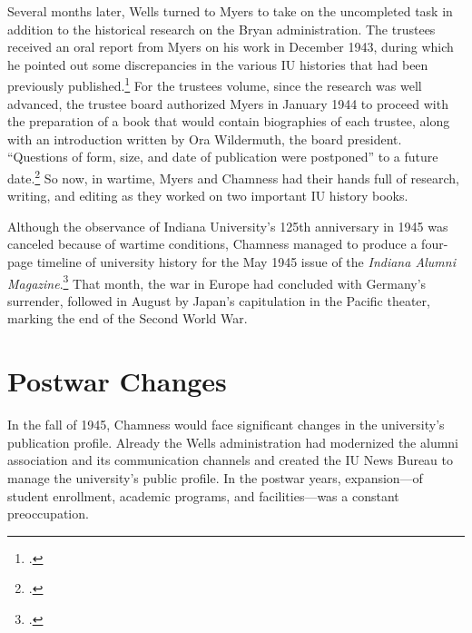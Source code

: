 \documentclass[
  american,
  letterpaper,
]{scrreprt}
\begin{document}
Several months later, Wells turned to Myers to take on the uncompleted
task in addition to the historical research on the Bryan administration.
The trustees received an oral report from Myers on his work in December
1943, during which he pointed out some discrepancies in the various IU
histories that had been previously published.\footnote{.}
For the trustees volume, since the research was well advanced, the
trustee board authorized Myers in January 1944 to proceed with the
preparation of a book that would contain biographies of each trustee,
along with an introduction written by Ora Wildermuth, the board
president. ``Questions of form, size, and date of publication were
postponed'' to a future date.\footnote{.}
So now, in wartime, Myers and Chamness had their hands full of research,
writing, and editing as they worked on two important IU history books.

Although the observance of Indiana University's 125th anniversary in
1945 was canceled because of wartime conditions, Chamness managed to
produce a four-page timeline of university history for the May 1945
issue of the \emph{Indiana Alumni Magazine}.\footnote{.} That month, the war in Europe had concluded
with Germany's surrender, followed in August by Japan's capitulation in
the Pacific theater, marking the end of the Second World War.

\section{Postwar Changes}\label{postwar-changes}

In the fall of 1945, Chamness would face significant changes in the
university's publication profile. Already the Wells administration had
modernized the alumni association and its communication channels and
created the IU News Bureau to manage the university's public profile. In
the postwar years, expansion---of student enrollment, academic programs,
and facilities---was a constant preoccupation.
\end{document}
